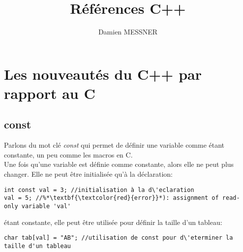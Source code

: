\documentclass[onecolumn]{book}%
\begin{document}
\title{R\'ef\'erences C++}
\author{Damien MESSNER}
\maketitle
\tableofcontents

\chapter{Les nouveaut\'es du C++ par rapport au C}
\section{const}
Parlons du mot cl\'e \emph{const} qui permet de d\'efinir une variable comme \'etant constante, un peu comme les macros en C.\\

Une fois qu'une variable est d\'efinie comme constante, alors elle ne peut plus changer. Elle ne peut \^etre initialis\'ee qu'à la d\'eclaration:
\begin{framed}
\begin{lstlisting}
int const val = 3; //initialisation à la d\'eclaration
val = 5; //%*\textbf{\textcolor{red}{error}}*): assignment of read-only variable 'val'
\end{lstlisting}
\end{framed}

\'etant constante, elle peut \^etre utilis\'ee pour d\'efinir la taille d'un tableau:

\begin{framed}
\begin{lstlisting}
char tab[val] = "AB"; //utilisation de const pour d\'eterminer la taille d'un tableau
\end{lstlisting}
\end{framed}
\end{document}
